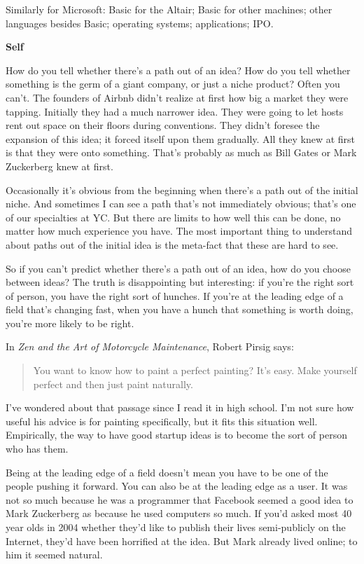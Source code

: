 Similarly for Microsoft: Basic for the Altair; Basic for other machines;
other languages besides Basic; operating systems; applications; IPO.

\textbf{Self}

How do you tell whether there's a path out of an idea? How do you tell
whether something is the germ of a giant company, or just a niche
product? Often you can't. The founders of Airbnb didn't realize at first
how big a market they were tapping. Initially they had a much narrower
idea. They were going to let hosts rent out space on their floors during
conventions. They didn't foresee the expansion of this idea; it forced
itself upon them gradually. All they knew at first is that they were
onto something. That's probably as much as Bill Gates or Mark Zuckerberg
knew at first.

Occasionally it's obvious from the beginning when there's a path out of
the initial niche. And sometimes I can see a path that's not immediately
obvious; that's one of our specialties at YC. But there are limits to
how well this can be done, no matter how much experience you have. The
most important thing to understand about paths out of the initial idea
is the meta-fact that these are hard to see.

So if you can't predict whether there's a path out of an idea, how do
you choose between ideas? The truth is disappointing but interesting: if
you're the right sort of person, you have the right sort of hunches. If
you're at the leading edge of a field that's changing fast, when you
have a hunch that something is worth doing, you're more likely to be
right.

In \emph{Zen and the Art of Motorcycle Maintenance}, Robert Pirsig says:

\begin{quote}
You want to know how to paint a perfect painting? It's easy. Make
yourself perfect and then just paint naturally.
\end{quote}

I've wondered about that passage since I read it in high school. I'm not
sure how useful his advice is for painting specifically, but it fits
this situation well. Empirically, the way to have good startup ideas is
to become the sort of person who has them.

Being at the leading edge of a field doesn't mean you have to be one of
the people pushing it forward. You can also be at the leading edge as a
user. It was not so much because he was a programmer that Facebook
seemed a good idea to Mark Zuckerberg as because he used computers so
much. If you'd asked most 40 year olds in 2004 whether they'd like to
publish their lives semi-publicly on the Internet, they'd have been
horrified at the idea. But Mark already lived online; to him it seemed
natural.

